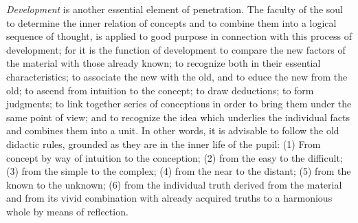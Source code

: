 \emph{Development} is another essential element of penetration. The faculty of the soul to determine the inner relation of concepts and to combine them into a logical sequence of thought, is applied to good purpose in connection with this process of development; for it is the function of development to compare the new factors of the material with those already known; to recognize both in their essential characteristics; to associate the new with the old, and to educe the new from the old; to ascend from intuition to the concept; to draw deductions; to form judgments; to link together series of conceptions in order to bring them under the same point of view; and to recognize the idea which underlies the individual facts and combines them into a unit. In other words, it is advisable to follow the old didactic rules, grounded as they are in the inner life of the pupil: (1) From concept by way of intuition to the conception; (2) from the easy to the difficult; (3) from the simple to the complex; (4) from the
near to the distant; (5) from the known to the unknown; (6) from the individual truth derived from the material and from its vivid combination with already acquired truths to a harmonious whole by means of reflection.

